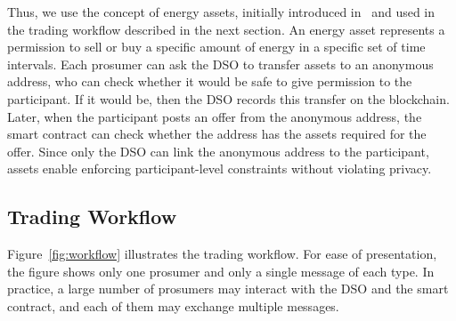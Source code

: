 Thus, we use the concept of energy assets, initially introduced  in~\cite{Laszka17} and  used in the trading workflow described in the next section.
An energy asset represents a permission to sell or buy a specific amount of energy in a specific set of  time intervals. 
Each prosumer can ask the DSO to transfer assets to an anonymous address, who can check whether it would be safe to give permission to the participant.
If it would be, then the DSO records this transfer on the blockchain.
Later, when the participant posts an offer from the anonymous address, the smart contract can check whether the address has the assets required for the offer.
Since only the DSO can link the anonymous address to the participant, assets enable enforcing participant-level constraints without violating privacy.


\subsection{Trading Workflow}

Figure~\ref{fig:workflow} illustrates the trading workflow.
For ease of presentation, the figure shows only one prosumer and only a single message of each type.
In practice, a large number of prosumers may interact with the DSO and the smart contract, and each of them may exchange multiple messages.

\newcommand{\msgDesc}[1]{{\footnotesize{\texttt{#1}}}}

